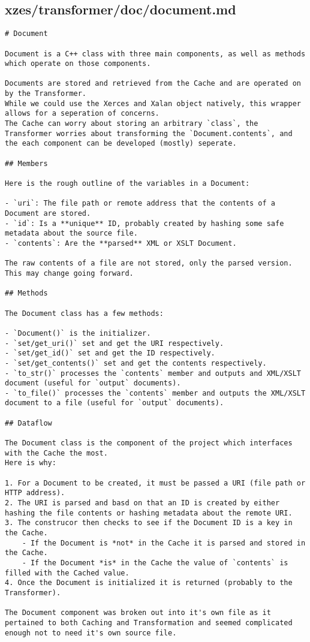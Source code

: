 \subsection{xzes/transformer/doc/document.md}
\begin{lstlisting}[caption={Documentation about the document class abstraction.}]
# Document

Document is a C++ class with three main components, as well as methods which operate on those components.

Documents are stored and retrieved from the Cache and are operated on by the Transformer.
While we could use the Xerces and Xalan object natively, this wrapper allows for a seperation of concerns.
The Cache can worry about storing an arbitrary `class`, the Transformer worries about transforming the `Document.contents`, and the each component can be developed (mostly) seperate.

## Members

Here is the rough outline of the variables in a Document:

- `uri`: The file path or remote address that the contents of a Document are stored.
- `id`: Is a **unique** ID, probably created by hashing some safe metadata about the source file.
- `contents`: Are the **parsed** XML or XSLT Document.

The raw contents of a file are not stored, only the parsed version.
This may change going forward.

## Methods

The Document class has a few methods:

- `Document()` is the initializer.
- `set/get_uri()` set and get the URI respectively.
- `set/get_id()` set and get the ID respectively.
- `set/get_contents()` set and get the contents respectively.
- `to_str()` processes the `contents` member and outputs and XML/XSLT document (useful for `output` documents).
- `to_file()` processes the `contents` member and outputs the XML/XSLT document to a file (useful for `output` documents).

## Dataflow

The Document class is the component of the project which interfaces with the Cache the most.
Here is why:

1. For a Document to be created, it must be passed a URI (file path or HTTP address).
2. The URI is parsed and basd on that an ID is created by either hashing the file contents or hashing metadata about the remote URI.
3. The construcor then checks to see if the Document ID is a key in the Cache.
    - If the Document is *not* in the Cache it is parsed and stored in the Cache.
    - If the Document *is* in the Cache the value of `contents` is filled with the Cached value.
4. Once the Document is initialized it is returned (probably to the Transformer).

The Document component was broken out into it's own file as it pertained to both Caching and Transformation and seemed complicated enough not to need it's own source file.
\end{lstlisting}
